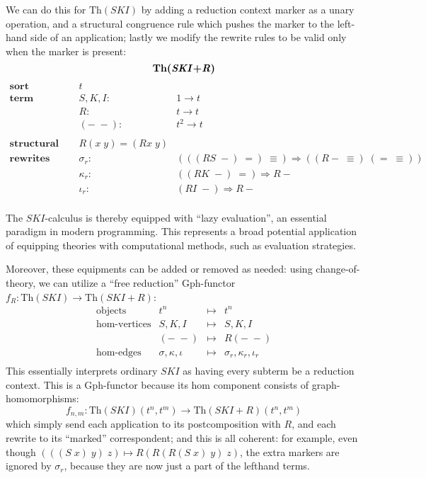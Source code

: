 \documentclass{amsart}
\theoremstyle{definition}
\newcommand{\Th}{\mathrm{Th}}
\newcommand{\Gph}{\mathrm{Gph}}
\newcommand{\maps}{\colon}
\begin{document}
We can do this for $\Th(SKI)$ by adding a reduction context marker as a unary operation, and a structural congruence rule which pushes the marker to the left-hand side of an application; lastly we modify the rewrite rules to be valid only when the marker is present:
$$\textbf{Th(\textit{SKI}+\textit{R})}$$
\[\begin{array}{rcl}
\textbf{sort} & t &\\
\textbf{term constructors} & S,K,I \maps &1 \to t\\
& R\maps & t \to t\\
& (-\; -)\maps & t^2 \to t\\\\
\textbf{structural congruence} & R(x\; y) = (Rx\; y) &\\
\textbf{rewrites} & \sigma_r\maps & (((RS\; -)\; =)\; \equiv) \Rightarrow ((R-\; \equiv)\; (=\; \equiv))\\
& \kappa_r\maps & ((RK\; -)\; =) \Rightarrow R-\\
& \iota_r\maps & (RI\; -) \Rightarrow R-\\
\end{array}\]

The $SKI$-calculus is thereby equipped with ``lazy evaluation'', an essential paradigm in modern programming. This represents a broad potential application of equipping theories with computational methods, such as evaluation strategies.

Moreover, these equipments can be added or removed as needed: using change-of-theory, we can utilize a ``free reduction'' $\Gph$-functor $f_R\maps\Th(SKI)\to \Th(SKI+R)$:
\[\begin{array}{rrcl}
\text{objects} & t^n & \mapsto & t^n\\
\text{hom-vertices} & S,K,I & \mapsto & S,K,I\\
& (-\; -) & \mapsto & R(-\; -)\\
\text{hom-edges} & \sigma, \kappa, \iota & \mapsto & \sigma_r, \kappa_r, \iota_r\\
\end{array}\]
This essentially interprets ordinary $SKI$ as having every subterm be a reduction context. This is a $\Gph$-functor because its hom component consists of graph-homomorphisms: $$f_{n,m}\maps \Th(SKI)(t^n,t^m) \to \Th(SKI+R)(t^n,t^m)$$ which simply send each application to its postcomposition with $R$, and each rewrite to its ``marked'' correspondent; and this is all coherent: for example, even though $(((S\; x)\; y)\; z) \mapsto R(R(R(S\; x)\; y)\; z)$, the extra markers are ignored by $\sigma_r$, because they are now just a part of the lefthand terms.
\end{document}
